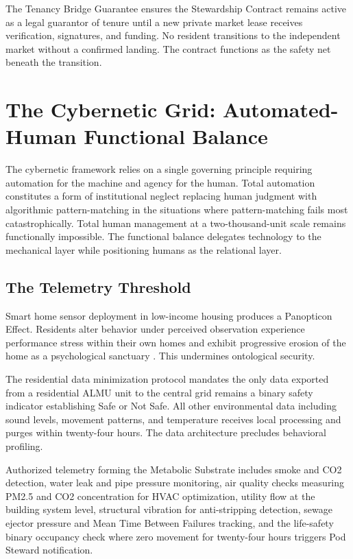 \documentclass[12pt, letterpaper]{article}
\begin{document}
The Tenancy Bridge Guarantee ensures the Stewardship Contract remains active as a legal guarantor of tenure until a new private market lease receives verification, signatures, and funding. No resident transitions to the independent market without a confirmed landing. The contract functions as the safety net beneath the transition.

\clearpage
\section{The Cybernetic Grid: Automated-Human Functional Balance}

The cybernetic framework relies on a single governing principle requiring automation for the machine and agency for the human. Total automation constitutes a form of institutional neglect replacing human judgment with algorithmic pattern-matching in the situations where pattern-matching fails most catastrophically. Total human management at a two-thousand-unit scale remains functionally impossible. The functional balance delegates technology to the mechanical layer while positioning humans as the relational layer.

\subsection{The Telemetry Threshold}

Smart home sensor deployment in low-income housing produces a Panopticon Effect. Residents alter behavior under perceived observation experience performance stress within their own homes and exhibit progressive erosion of the home as a psychological sanctuary \citep{nyu_marron_2024, usc_surveillance_2024}. This undermines ontological security.

The residential data minimization protocol mandates the only data exported from a residential ALMU unit to the central grid remains a binary safety indicator establishing Safe or Not Safe. All other environmental data including sound levels, movement patterns, and temperature receives local processing and purges within twenty-four hours. The data architecture precludes behavioral profiling.

Authorized telemetry forming the Metabolic Substrate includes smoke and CO2 detection, water leak and pipe pressure monitoring, air quality checks measuring PM2.5 and CO2 concentration for HVAC optimization, utility flow at the building system level, structural vibration for anti-stripping detection, sewage ejector pressure and Mean Time Between Failures tracking, and the life-safety binary occupancy check where zero movement for twenty-four hours triggers Pod Steward notification.
\end{document}
